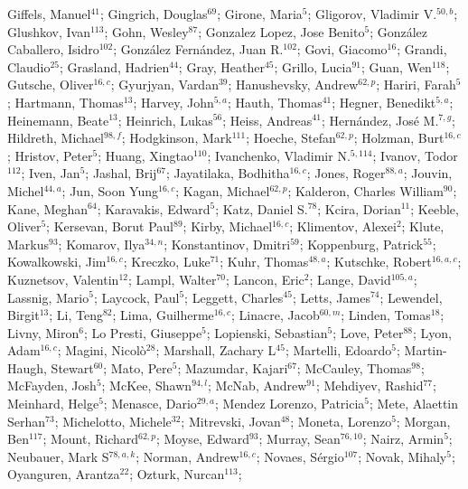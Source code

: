 Giffels, Manuel$^{41}$;
Gingrich, Douglas$^{69}$;
Girone, Maria$^{5}$;
Gligorov, Vladimir V.$^{50,b}$;
Glushkov, Ivan$^{113}$;
Gohn, Wesley$^{87}$;
Gonzalez Lopez, Jose Benito$^{5}$;
González Caballero, Isidro$^{102}$;
González Fernández, Juan R.$^{102}$;
Govi, Giacomo$^{16}$;
Grandi, Claudio$^{25}$;
Grasland, Hadrien$^{44}$;
Gray, Heather$^{45}$;
Grillo, Lucia$^{91}$;
Guan, Wen$^{118}$;
Gutsche, Oliver$^{16,c}$;
Gyurjyan, Vardan$^{39}$;
Hanushevsky, Andrew$^{62,p}$;
Hariri, Farah$^{5}$;
Hartmann, Thomas$^{13}$;
Harvey, John$^{5,a}$;
Hauth, Thomas$^{41}$;
Hegner, Benedikt$^{5,a}$;
Heinemann, Beate$^{13}$;
Heinrich, Lukas$^{56}$;
Heiss, Andreas$^{41}$;
Hernández, José M.$^{7,g}$;
Hildreth, Michael$^{98,f}$;
Hodgkinson, Mark$^{111}$;
Hoeche, Stefan$^{62,p}$;
Holzman, Burt$^{16,c}$;
Hristov, Peter$^{5}$;
Huang, Xingtao$^{110}$;
Ivanchenko, Vladimir N.$^{5,114}$;
Ivanov, Todor$^{112}$;
Iven, Jan$^{5}$;
Jashal, Brij$^{67}$;
Jayatilaka, Bodhitha$^{16,c}$;
Jones, Roger$^{88,a}$;
Jouvin, Michel$^{44,a}$;
Jun, Soon Yung$^{16,c}$;
Kagan, Michael$^{62,p}$;
Kalderon, Charles William$^{90}$;
Kane, Meghan$^{64}$;
Karavakis, Edward$^{5}$;
Katz, Daniel S.$^{78}$;
Kcira, Dorian$^{11}$;
Keeble, Oliver$^{5}$;
Kersevan, Borut Paul$^{89}$;
Kirby, Michael$^{16,c}$;
Klimentov, Alexei$^{2}$;
Klute, Markus$^{93}$;
Komarov, Ilya$^{34,n}$;
Konstantinov, Dmitri$^{59}$;
Koppenburg, Patrick$^{55}$;
Kowalkowski, Jim$^{16,c}$;
Kreczko, Luke$^{71}$;
Kuhr, Thomas$^{48,a}$;
Kutschke, Robert$^{16,a,c}$;
Kuznetsov, Valentin$^{12}$;
Lampl, Walter$^{70}$;
Lancon, Eric$^{2}$;
Lange, David$^{105,a}$;
Lassnig, Mario$^{5}$;
Laycock, Paul$^{5}$;
Leggett, Charles$^{45}$;
Letts, James$^{74}$;
Lewendel, Birgit$^{13}$;
Li, Teng$^{82}$;
Lima, Guilherme$^{16,c}$;
Linacre, Jacob$^{60,m}$;
Linden, Tomas$^{18}$;
Livny, Miron$^{6}$;
Lo Presti, Giuseppe$^{5}$;
Lopienski, Sebastian$^{5}$;
Love, Peter$^{88}$;
Lyon, Adam$^{16,c}$;
Magini, Nicolò$^{28}$;
Marshall, Zachary L$^{45}$;
Martelli, Edoardo$^{5}$;
Martin-Haugh, Stewart$^{60}$;
Mato, Pere$^{5}$;
Mazumdar, Kajari$^{67}$;
McCauley, Thomas$^{98}$;
McFayden, Josh$^{5}$;
McKee, Shawn$^{94,l}$;
McNab, Andrew$^{91}$;
Mehdiyev, Rashid$^{77}$;
Meinhard, Helge$^{5}$;
Menasce, Dario$^{29,a}$;
Mendez Lorenzo, Patricia$^{5}$;
Mete, Alaettin Serhan$^{73}$;
Michelotto, Michele$^{32}$;
Mitrevski, Jovan$^{48}$;
Moneta, Lorenzo$^{5}$;
Morgan, Ben$^{117}$;
Mount, Richard$^{62,p}$;
Moyse, Edward$^{93}$;
Murray, Sean$^{76,10}$;
Nairz, Armin$^{5}$;
Neubauer, Mark S$^{78,a,k}$;
Norman, Andrew$^{16,c}$;
Novaes, Sérgio$^{107}$;
Novak, Mihaly$^{5}$;
Oyanguren, Arantza$^{22}$;
Ozturk, Nurcan$^{113}$;
